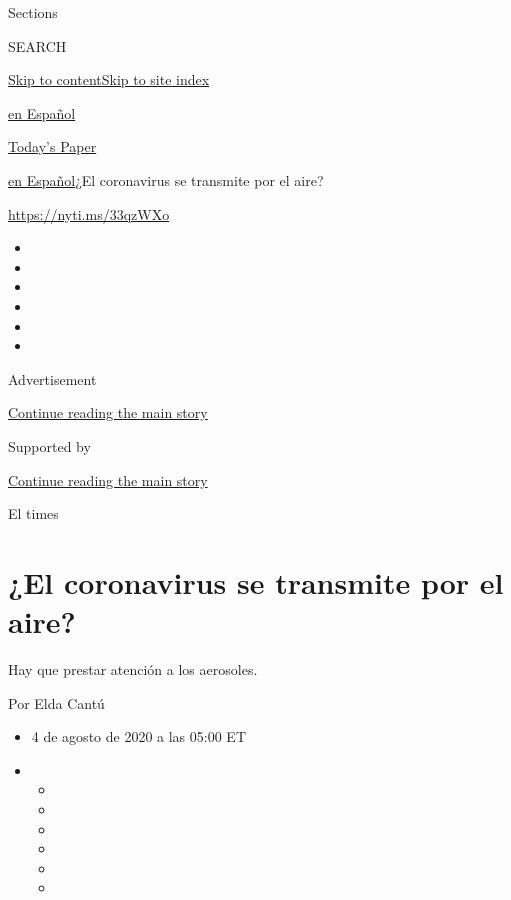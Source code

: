 Sections

SEARCH

\protect\hyperlink{site-content}{Skip to
content}\protect\hyperlink{site-index}{Skip to site index}

\href{https://www.nytimes3xbfgragh.onion/es/}{en Español}

\href{https://myaccount.nytimes3xbfgragh.onion/auth/login?response_type=cookie\&client_id=vi}{}

\href{https://www.nytimes3xbfgragh.onion/section/todayspaper}{Today's
Paper}

\href{/es/}{en Español}\textbar{}¿El coronavirus se transmite por el
aire?

\url{https://nyti.ms/33qzWXo}

\begin{itemize}
\item
\item
\item
\item
\item
\item
\end{itemize}

Advertisement

\protect\hyperlink{after-top}{Continue reading the main story}

Supported by

\protect\hyperlink{after-sponsor}{Continue reading the main story}

El times

\hypertarget{el-coronavirus-se-transmite-por-el-aire}{%
\section{¿El coronavirus se transmite por el
aire?}\label{el-coronavirus-se-transmite-por-el-aire}}

Hay que prestar atención a los aerosoles.

Por Elda Cantú

\begin{itemize}
\item
  4 de agosto de 2020 a las 05:00 ET
\item
  \begin{itemize}
  \item
  \item
  \item
  \item
  \item
  \item
  \end{itemize}
\end{itemize}

